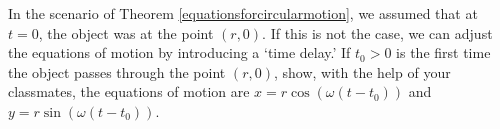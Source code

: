 {In the scenario of Theorem \ref{equationsforcircularmotion}, we assumed that at $t=0$, the object was at the point $(r,0)$.  If this is not the case,  we can adjust the equations of motion by introducing a `time delay.'   If $t_{0} > 0$ is the first time the object passes through the point $(r,0)$, show, with the help of your classmates, the equations of motion are $x = r \cos(\omega (t - t_{0}))$ and $y = r \sin(\omega (t-t_{0}))$.}
{}